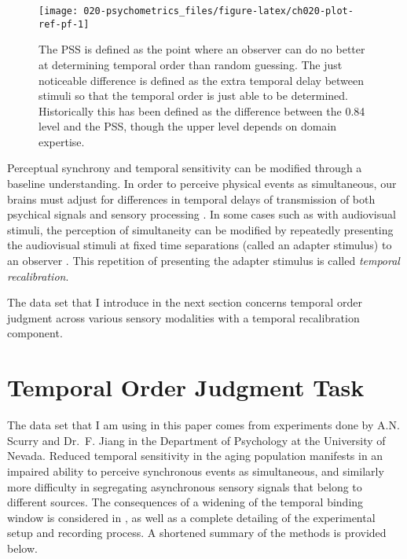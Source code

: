 \documentclass[11pt, oneside, openany]{scrbook}
\begin{document}
\begin{figure}

{\centering \texttt{[image: 020-psychometrics\_files/figure-latex/ch020-plot-ref-pf-1]} 

}

\caption{The PSS is defined as the point where an observer can do no better at determining temporal order than random guessing. The just noticeable difference is defined as the extra temporal delay between stimuli so that the temporal order is just able to be determined. Historically this has been defined as the difference between the 0.84 level and the PSS, though the upper level depends on domain expertise.}\label{fig:ch020-plot-ref-pf}
\end{figure}

Perceptual synchrony and temporal sensitivity can be modified through a baseline understanding. In order to perceive physical events as simultaneous, our brains must adjust for differences in temporal delays of transmission of both psychical signals and sensory processing \citep{fujisaki2004recalibration}. In some cases such as with audiovisual stimuli, the perception of simultaneity can be modified by repeatedly presenting the audiovisual stimuli at fixed time separations (called an adapter stimulus) to an observer \citep{vroomen2004recalibration}. This repetition of presenting the adapter stimulus is called \emph{temporal recalibration}.

The data set that I introduce in the next section concerns temporal order judgment across various sensory modalities with a temporal recalibration component.

\hypertarget{toj-task}{%
\section{Temporal Order Judgment Task}\label{toj-task}}

The data set that I am using in this paper comes from experiments done by A.N. Scurry and Dr.~F. Jiang in the Department of Psychology at the University of Nevada. Reduced temporal sensitivity in the aging population manifests in an impaired ability to perceive synchronous events as simultaneous, and similarly more difficulty in segregating asynchronous sensory signals that belong to different sources. The consequences of a widening of the temporal binding window is considered in \citet{scurry2019aging}, as well as a complete detailing of the experimental setup and recording process. A shortened summary of the methods is provided below.
\end{document}
